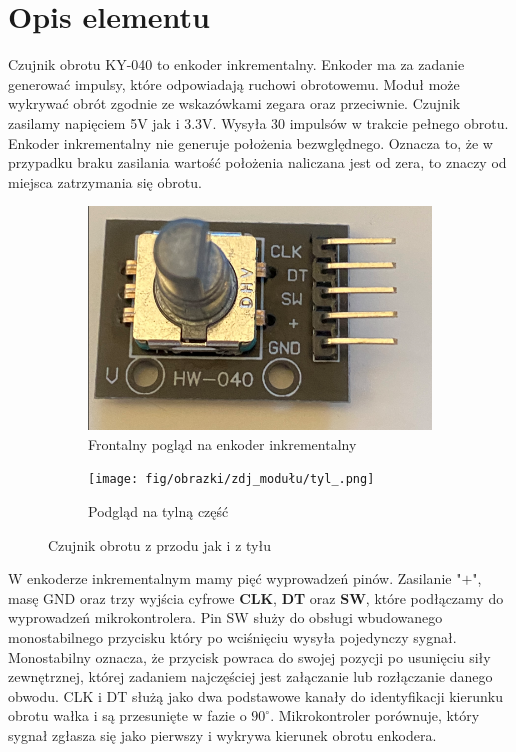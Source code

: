 \documentclass[11pt, a4paper]{article}
\author{Hubert Pietrzak}
\institute{Instytut Robotyki i Inteligencji Maszynowej}
\begin{document}
\newpage

\section*{Opis elementu} 

Czujnik obrotu KY-040 to enkoder inkrementalny. Enkoder ma za zadanie generować impulsy, które odpowiadają ruchowi obrotowemu. Moduł może wykrywać obrót zgodnie ze wskazówkami zegara oraz przeciwnie. Czujnik zasilamy napięciem 5V jak i 3.3V. Wysyła 30 impulsów w trakcie pełnego obrotu. Enkoder inkrementalny nie generuje położenia bezwględnego. Oznacza to, że w przypadku braku zasilania wartość położenia naliczana jest od zera, to znaczy od miejsca zatrzymania się obrotu.


\vspace{0.5cm}
\begin{figure}[h]
\centering
\begin{subfigure}{.5\textwidth}
  \centering
  \includegraphics[width=.69\linewidth]{fig/obrazki/zdj_modułu/przód.png}
  \caption{Frontalny pogląd na enkoder inkrementalny}
  \label{fig:sub1}
\end{subfigure}%
\begin{subfigure}{.5\textwidth}
  \centering
  \texttt{[image: fig/obrazki/zdj\_modułu/tyl\_.png]}
  \caption{Podgląd na tylną część}
  \label{fig:sub2}
\end{subfigure}
\caption{Czujnik obrotu z przodu jak i z tyłu}
\label{fig:test}
\end{figure}
\vspace{0.5cm}


W enkoderze inkrementalnym mamy pięć wyprowadzeń pinów. Zasilanie "$+$", masę GND oraz trzy wyjścia cyfrowe \textbf{CLK}, \textbf{DT} oraz \textbf{SW}, które podłączamy do wyprowadzeń mikrokontrolera. Pin SW służy do obsługi wbudowanego monostabilnego przycisku który po wciśnięciu wysyła pojedynczy sygnał. Monostabilny oznacza, że przycisk powraca do swojej pozycji po usunięciu siły zewnętrznej, której zadaniem najczęściej jest załączanie lub rozłączanie danego obwodu. CLK i DT służą jako dwa podstawowe kanały do identyfikacji kierunku obrotu wałka i są przesunięte w fazie o $90^{\circ}$. Mikrokontroler porównuje, który sygnał zgłasza się jako pierwszy i wykrywa kierunek obrotu enkodera.
\end{document}
